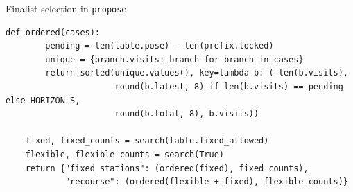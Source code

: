 \documentclass{swmcmthesis}
\begin{document}
\noindent Finalist selection in \texttt{propose}
\begin{lstlisting}[gobble=4]
    def ordered(cases):
        pending = len(table.pose) - len(prefix.locked)
        unique = {branch.visits: branch for branch in cases}
        return sorted(unique.values(), key=lambda b: (-len(b.visits),
                      round(b.latest, 8) if len(b.visits) == pending else HORIZON_S,
                      round(b.total, 8), b.visits))

    fixed, fixed_counts = search(table.fixed_allowed)
    flexible, flexible_counts = search(True)
    return {"fixed_stations": (ordered(fixed), fixed_counts),
            "recourse": (ordered(flexible + fixed), flexible_counts)}
\end{lstlisting}
\endgroup
\end{document}
